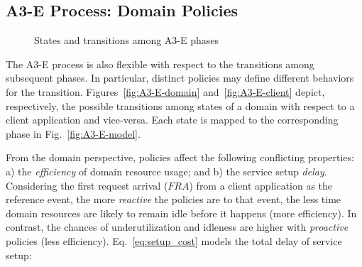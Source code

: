 \subsection{A3-E Process: Domain Policies}\label{sec:A3-E-policies}

\begin{figure}[tbp]
	\raggedright
	\hfill
	
	\hfill
	\caption{States and transitions among A3-E phases} \label{fig:A3-E-states}
\end{figure}



The A3-E process is also flexible with respect to the transitions among subsequent phases. In particular, distinct policies may define different behaviors for the transition. Figures~\ref{fig:A3-E-domain} and~\ref{fig:A3-E-client} depict, respectively, the possible transitions among states of a domain with respect to a client application and vice-versa. Each state is mapped to the corresponding phase in Fig.~\ref{fig:A3-E-model}. 

From the domain perspective, policies affect the following conflicting properties: a) the \textit{efficiency} of domain resource usage; and b) the service setup \textit{delay}. Considering the first request arrival ($FRA$) from a client application as the reference event, the more \textit{reactive} the policies are to that event, the less time domain resources are likely to remain idle before it happens (more efficiency). In contrast, the chances of underutilization and idleness are higher with \textit{proactive} policies (less efficiency). Eq.~\ref{eq:setup_cost} models the total delay of service setup:


